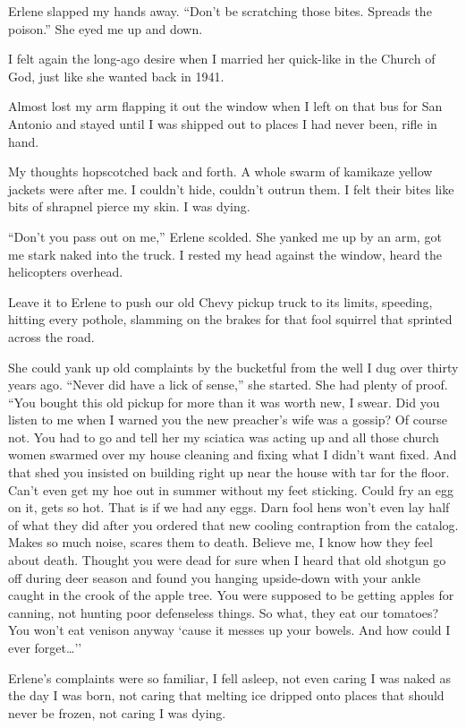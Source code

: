 \documentclass[twoside,10pt]{book}
\begin{document}
Erlene slapped my hands away. ``Don't be scratching those bites. Spreads
the poison.'' She eyed me up and down.

I felt again the long-ago desire when I married her quick-like in the
Church of God, just like she wanted back in 1941.

Almost lost my arm flapping it out the window when I left on that bus
for San Antonio and stayed until I was shipped out to places I had never
been, rifle in hand.

My thoughts hopscotched back and forth. A whole swarm of kamikaze yellow
jackets were after me. I couldn't hide, couldn't outrun them. I felt
their bites like bits of shrapnel pierce my skin. I was dying.

``Don't you pass out on me,'' Erlene scolded. She yanked me up by an
arm, got me stark naked into the truck. I rested my head against the
window, heard the helicopters overhead.

Leave it to Erlene to push our old Chevy pickup truck to its limits,
speeding, hitting every pothole, slamming on the brakes for that fool
squirrel that sprinted across the road.

She could yank up old complaints by the bucketful from the well I dug
over thirty years ago. ``Never did have a lick of sense,'' she started.
She had plenty of proof. ``You bought this old pickup for more than it
was worth new, I swear. Did you listen to me when I warned you the new
preacher's wife was a gossip? Of course not. You had to go and tell her
my sciatica was acting up and all those church women swarmed over my
house cleaning and fixing what I didn't want fixed. And that shed you
insisted on building right up near the house with tar for the floor.
Can't even get my hoe out in sum­mer without my feet sticking. Could fry
an egg on it, gets so hot. That is if we had any eggs. Darn fool hens
won't even lay half of what they did after you ordered that new cooling
contraption from the cata­log. Makes so much noise, scares them to
death. Believe me, I know how they feel about death. Thought you were
dead for sure when I heard that old shotgun go off during deer season
and found you hanging upside-down with your ankle caught in the crook of
the apple tree. You were supposed to be getting apples for canning, not
hunting poor defenseless things. So what, they eat our tomatoes? You
won't eat venison anyway `cause it messes up your bowels. And how could
I ever forget\ldots''

Erlene's complaints were so familiar, I fell asleep, not even caring I
was naked as the day I was born, not caring that melting ice dripped
onto places that should never be frozen, not caring I was dying.
\end{document}
